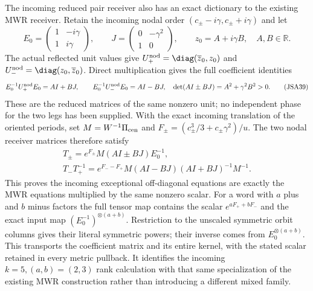 The incoming reduced pair receiver also has an exact dictionary
to the existing MWR receiver. Retain the incoming nodal order
$(c_\pm-i\gamma,c_\pm+i\gamma)$ and let
\[
 E_0=\begin{pmatrix}1&-i\gamma\\1&i\gamma\end{pmatrix},\qquad
 J=\begin{pmatrix}0&-\gamma^2\\1&0\end{pmatrix},\qquad
 z_0=A+i\gamma B,\quad A,B\in\mathbb R.
\]
The actual reflected unit values give
$U_+^{\rm nod}=\diag(\overline z_0,z_0)$ and
$U_-^{\rm nod}=\diag(z_0,\overline z_0)$. Direct multiplication
gives the full coefficient identities
\[
 E_0^{-1}U_+^{\rm nod}E_0=AI+BJ,\qquad
 E_0^{-1}U_-^{\rm nod}E_0=AI-BJ,
 \quad\det(AI\pm BJ)=A^2+\gamma^2B^2>0.
\tag{JSA39}
\]
These are the reduced matrices of the same nonzero unit; no
independent phase for the two legs has been supplied. With the
exact incoming translation of the oriented periods, set
$M=W^{-1}\Pi_{\rm cen}$ and
$F_\pm=(c_\pm^3/3+c_\pm\gamma^2)/u$. The two nodal receiver
matrices therefore satisfy
\[
\begin{gathered}
 T_\pm=e^{F_\pm}M(AI\pm BJ)E_0^{-1},\\
 T_-T_+^{-1}=e^{F_--F_+}
       M(AI-BJ)(AI+BJ)^{-1}M^{-1}.
\end{gathered}\tag{JSA40}
\]
This proves the incoming exceptional off-diagonal equations are
exactly the MWR equations multiplied by the same nonzero scalar.
For a word with $a$ plus and $b$ minus factors the full tensor
map contains the scalar $e^{aF_++bF_-}$ and the exact input map
$(E_0^{-1})^{\otimes(a+b)}$. Restriction to the unscaled symmetric
orbit columns gives their literal symmetric powers; their inverse
comes from $E_0^{\otimes(a+b)}$. This transports the coefficient
matrix and its entire kernel, with the stated scalar retained in
every metric pullback. It identifies the incoming $k=5,(a,b)=(2,3)$
rank calculation with that same specialization of the existing
MWR construction rather than introducing a different mixed family.
